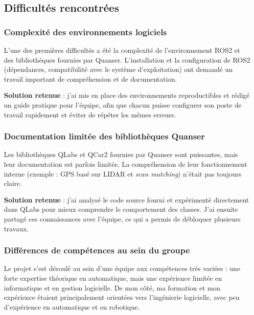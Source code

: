 \documentclass{name}
\begin{document}
\newpage

\subsection{Difficultés rencontrées}

\subsubsection{Complexité des environnements logiciels}

L'une des premières difficultés a été la complexité de l'environnement ROS2 et des bibliothèques fournies par Quanser. L'installation et la configuration de ROS2 (dépendances, compatibilité avec le système d'exploitation) ont demandé un travail important de compréhension et de documentation.

\textbf{Solution retenue} : j'ai mis en place des environnements reproductibles et rédigé un guide pratique pour l'équipe, afin que chacun puisse configurer son poste de travail rapidement et éviter de répéter les mêmes erreurs.

\subsubsection{Documentation limitée des bibliothèques Quanser}

Les bibliothèques QLabs et QCar2 fournies par Quanser sont puissantes, mais leur documentation est parfois limitée. La compréhension de leur fonctionnement interne (exemple : GPS basé sur LIDAR et \textit{scan matching}) n'était pas toujours claire.

\textbf{Solution retenue} : j'ai analysé le code source fourni et expérimenté directement dans QLabs pour mieux comprendre le comportement des classes. J'ai ensuite partagé ces connaissances avec l'équipe, ce qui a permis de débloquer plusieurs travaux.

\subsubsection{Différences de compétences au sein du groupe}

Le projet s'est déroulé au sein d'une équipe aux compétences très variées : une forte expertise théorique en automatique, mais une expérience limitée en informatique et en gestion logicielle. De mon côté, ma formation et mon expérience étaient principalement orientées vers l'ingénierie logicielle, avec peu d'expérience en automatique et en robotique.
\end{document}
